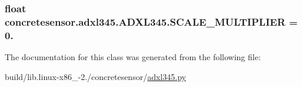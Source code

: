 \subsubsection[{S\+C\+A\+L\+E\+\_\+\+M\+U\+L\+T\+I\+P\+L\+I\+E\+R}]{\setlength{\rightskip}{0pt plus 5cm}float concretesensor.\+adxl345.\+A\+D\+X\+L345.\+S\+C\+A\+L\+E\+\_\+\+M\+U\+L\+T\+I\+P\+L\+I\+E\+R = 0.\hspace{0.3cm}{\ttfamily [static]}}\label{classconcretesensor_1_1adxl345_1_1ADXL345_a05a15fe5aad46a27d00c11655dec56e9}


The documentation for this class was generated from the following file\+:\begin{DoxyCompactItemize}
\item 
build/lib.\+linux-\/x86\+\_-\/2./concretesensor/\hyperlink{build_2lib_8linux-x86__64-2_87_2concretesensor_2adxl345_8py}{adxl345.\+py}\end{DoxyCompactItemize}
